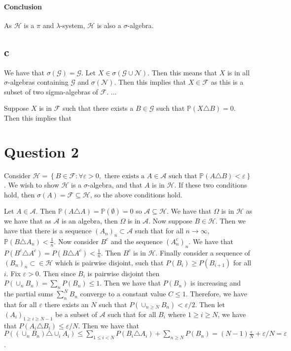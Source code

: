 \documentclass{article}
\theoremstyle{definition}
\numberwithin{theorem}{section}
\numberwithin{equation}{section}
\begin{document}
\paragraph{Conclusion}
As $\mathcal{H}$ is a $\pi$ and $\lambda$-system, $\mathcal{H}$ is also a $\sigma$-algebra. 

\subsection{c}
We have that $\sigma(\mathcal{G}) = \mathcal{G}$. 
Let $X \in \sigma(\mathcal{G} \cup \mathcal{N})$. Then this means that $X$ is in all $\sigma$-algebras containing $\mathcal{G}$ and $\sigma(\mathcal{N})$. Then this implies that $X \in \mathcal{F}$ as this is a subset of two sigma-algebras of $\mathcal{F}$. ...

Suppose $X$ is in $\mathcal{F}$ such that there exists a $B \in \mathcal{G}$ such that $\mathbb{P}(X \triangle B) = 0$. Then this implies that 


\section{Question 2}
Consider $\mathcal{H} = \left\{ B \in \mathcal{F}: \forall \varepsilon > 0, \text{ there exists a } A \in \mathcal{A} \text{ such that } \mathbb{P}(A \triangle B) < \varepsilon \right\}$. We wish to show $\mathcal{H}$ is a $\sigma$-algebra, and that $A$ is in $\mathcal{H}$. If these two conditions hold, then $\sigma(A) = \mathcal{F} \subseteq \mathcal{H}$, so the above conditions hold. 

Let $A \in \mathcal{A}$. Then $\mathbb{P}(A \triangle A) = \mathbb{P}(\emptyset) = 0$ so $\mathcal{A} \subseteq \mathcal{H}$.
We have that $\Omega$ is in $\mathcal{H}$ as we have that as $\mathcal{A}$ is an algebra, then $\Omega$ is in $\mathcal{A}$. Now suppose $B \in \mathcal{H}$. Then we have that there is a sequence $(A_n)_n \subset \mathcal{A}$ such that for all $n \rightarrow \infty$, $\mathbb{P}(B \triangle A_n) < \frac{1}{n}$. 
Now consider $B^c$ and the sequence $(A_n^c)_n$. We have that $P(B^c \triangle A^c) = P(B \triangle A^c) < \frac{1}{n}$. Then $B^c$ is in $\mathcal{H}$. 
Finally consider a sequence of $(B_n)_n \subset \in \mathcal{H}$ which is pairwise disjoint, such that $P(B_i) \geq P(B_{i + 1})$ for all $i$. Fix $\varepsilon > 0$. Then since $B_i$ is pairwise disjoint then $P(\cup_n B_n) = \sum_n P(B_n) \leq 1$. Then we have that $P(B_n)$ is increasing and the partial sums $\sum_n^N B_n$ converge to a constant value $C \leq 1$. Therefore, we have that for all $\varepsilon$ there exists an $N$ such that $P(\cup_{n \geq N}B_n) < \varepsilon/2$. Then let $(A_i)_{1 \geq i \geq N - 1}$ be a subset of $\mathcal{A}$ such that for all $B_i$ where $1 \geq i \geq N$, we have that $P(A_i \triangle B_i) \leq \varepsilon/N$. Then we have that $P((\cup_n B_n) \triangle \cup_i A_i ) \leq \sum_{1 \leq i < N} P(B_i \triangle A_i) + \sum_{n \geq N} P(B_n) = (N-1)\frac{\varepsilon}{N} + \varepsilon/N = \varepsilon$. 
\end{document}
